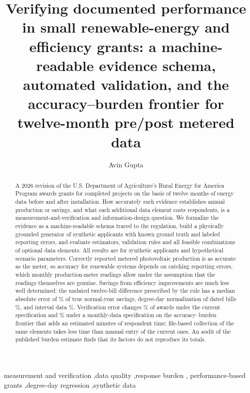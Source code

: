\documentclass[preprint,12pt]{elsarticle}
\begin{document}
\begin{frontmatter}
\title{Verifying documented performance in small renewable-energy and efficiency grants:
a machine-readable evidence schema, automated validation, and the accuracy--burden
frontier for twelve-month pre/post metered data}
\author{Avin Gupta}
\address{\texttt{iamavingupta@gmail.com}}

\begin{abstract}
A 2026 revision of the U.S. Department of Agriculture's Rural Energy for America Program
awards grants for completed projects on the basis of twelve months of energy data before
and after installation. How accurately such evidence establishes annual production or
savings, and what each additional data element costs respondents, is a
measurement-and-verification and information-design question. We formalize the evidence
as a machine-readable schema traced to the regulation, build a physically grounded
generator of synthetic applicants with known ground truth and labeled reporting errors,
and evaluate estimators, \NRules{} validation rules and all \NSpecs{} feasible combinations
of \NOptionalElements{} optional data elements. All results are for synthetic applicants
and hypothetical scenario parameters. Correctly reported metered photovoltaic production is as accurate as the meter, so
accuracy for renewable systems depends on catching reporting errors, which monthly
production-meter readings allow under the assumption that the readings themselves are
genuine. Savings from efficiency improvements are much less well determined:
the undated twelve-bill difference prescribed by the rule has a median absolute error of
\PathUndatedNormalMedian\% of true normal-year savings, degree-day normalization of dated
bills \PathNormNormalMedian\%, and interval data \PathIntervalPathNormalMedian\%.
Verification error changes \SelCurrentValidatedMid\% of awards under the current
specification and \SelRecValidatedMid\% under a monthly-data specification on the
accuracy--burden frontier that adds an estimated \RecBurdenIncrease{} minutes of respondent
time; file-based collection of the same elements takes less time than manual entry of the
current ones. An audit of the published burden estimate finds that its factors do not
reproduce its totals.
\end{abstract}
\begin{keyword}
measurement and verification \sep data quality \sep response burden \sep
performance-based grants \sep degree-day regression \sep synthetic data
\end{keyword}
\end{frontmatter}
\end{document}
